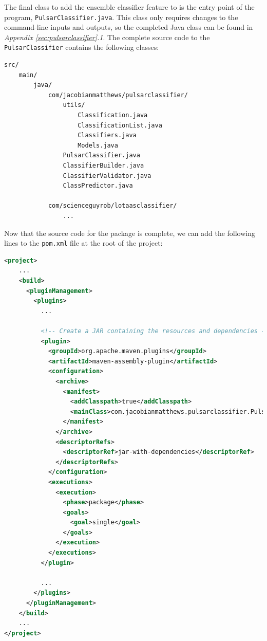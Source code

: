 \documentclass{article}
\begin{document}
\begin{appendices}
\begin{subappendices}
The final class to add the ensemble classifier feature to is the entry point of the program, \verb|PulsarClassifier.java|. This class only requires changes to the command-line inputs and outputs, so the completed Java class can be found in \emph{Appendix \ref{sec:pulsarclassifier}.1}. The complete source code to the \verb|PulsarClassifier| contains the following classes:

\begin{lstlisting}[numbers=none]
src/
    main/
        java/
            com/jacobianmatthews/pulsarclassifier/
                utils/
                    Classification.java
                    ClassificationList.java
                    Classifiers.java
                    Models.java
                PulsarClassifier.java
                ClassifierBuilder.java
                ClassifierValidator.java
                ClassPredictor.java

            com/scienceguyrob/lotaasclassifier/
                ...

\end{lstlisting}

Now that the source code for the package is complete, we can add the following lines to the \verb|pom.xml| file at the root of the project:

\begin{lstlisting}[numbers=none, language=xml, title=pom.xml, basicstyle=\footnotesize\ttfamily]
<project>
    ...
    <build>
      <pluginManagement>
        <plugins>
          ...

          <!-- Create a JAR containing the resources and dependencies -->
          <plugin>
            <groupId>org.apache.maven.plugins</groupId>
            <artifactId>maven-assembly-plugin</artifactId>
            <configuration>
              <archive>
                <manifest>
                  <addClasspath>true</addClasspath>
                  <mainClass>com.jacobianmatthews.pulsarclassifier.PulsarClassifier</mainClass>
                </manifest>
              </archive>
              <descriptorRefs>
                <descriptorRef>jar-with-dependencies</descriptorRef>
              </descriptorRefs>
            </configuration>
            <executions>
              <execution>
                <phase>package</phase>
                <goals>
                  <goal>single</goal>
                </goals>
              </execution>
            </executions>
          </plugin>

          ...
        </plugins>
      </pluginManagement>
    </build>
    ...
</project>
\end{lstlisting}


\end{subappendices}
\end{appendices}
\end{document}
